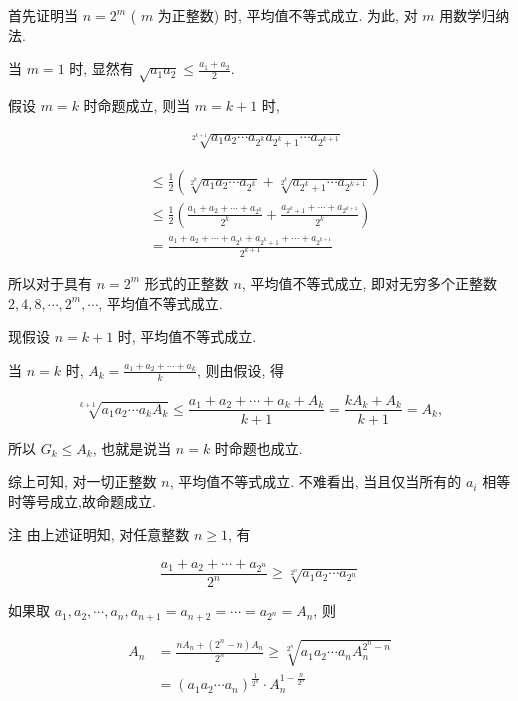 首先证明当 $n=2^{m}$ ( $m$ 为正整数) 时, 平均值不等式成立. 为此, 对 $m$ 用数学归纳法.

当 $m=1$ 时, 显然有 $\sqrt{a_{1} a_{2}} \leqslant \frac{a_{1}+a_{2}}{2}$.

假设 $m=k$ 时命题成立, 则当 $m=k+1$ 时,

$$
\begin{aligned}
& \sqrt[2^{k+1}]{a_{1} a_{2} \cdots a_{2^{k}} a_{2^{k}+1} \cdots a_{2^{k+1}}}
\end{aligned}
$$


$$
\begin{aligned}
& \leqslant \frac{1}{2}\left(\sqrt[2^{k}]{a_{1} a_{2} \cdots a_{2^{k}}}+\sqrt[2^{k}]{a_{2^{k}+1} \cdots a_{2^{k+1}}}\right) \\
& \leqslant \frac{1}{2}\left(\frac{a_{1}+a_{2}+\cdots+a_{2^{k}}}{2^{k}}+\frac{a_{2^{k}+1}+\cdots+a_{2^{k+1}}}{2^{k}}\right) \\
& =\frac{a_{1}+a_{2}+\cdots+a_{2^{k}}+a_{2^{k}+1}+\cdots+a_{2^{k+1}}}{2^{k+1}}
\end{aligned}
$$

所以对于具有 $n=2^{m}$ 形式的正整数 $n$, 平均值不等式成立, 即对无穷多个正整数 $2,4,8, \cdots, 2^{m}, \cdots$, 平均值不等式成立.

现假设 $n=k+1$ 时, 平均值不等式成立.

当 $n=k$ 时, $A_{k}=\frac{a_{1}+a_{2}+\cdots+a_{k}}{k}$, 则由假设, 得

$$
\sqrt[k+1]{a_{1} a_{2} \cdots a_{k} A_{k}} \leqslant \frac{a_{1}+a_{2}+\cdots+a_{k}+A_{k}}{k+1}=\frac{k A_{k}+A_{k}}{k+1}=A_{k},
$$

所以 $G_{k} \leqslant A_{k}$, 也就是说当 $n=k$ 时命题也成立.

综上可知, 对一切正整数 $n$, 平均值不等式成立. 不难看出, 当且仅当所有的 $a_{i}$ 相等时等号成立,故命题成立.

注 由上述证明知, 对任意整数 $n \geqslant 1$, 有

$$
\frac{a_{1}+a_{2}+\cdots+a_{2^{n}}}{2^{n}} \geqslant \sqrt[2^{n}]{a_{1} a_{2} \cdots a_{2^{n}}}
$$

如果取 $a_{1}, a_{2}, \cdots, a_{n}, a_{n+1}=a_{n+2}=\cdots=a_{2^{n}}=A_{n}$, 则

$$
\begin{aligned}
A_{n} & =\frac{n A_{n}+\left(2^{n}-n\right) A_{n}}{2^{n}} \geqslant \sqrt[2^{n}]{a_{1} a_{2} \cdots a_{n} A_{n}^{2^{n}-n}} \\
& =\left(a_{1} a_{2} \cdots a_{n}\right)^{\frac{1}{2^{n}}} \cdot A_{n}^{1-\frac{n}{2^{n}}}
\end{aligned}
$$

